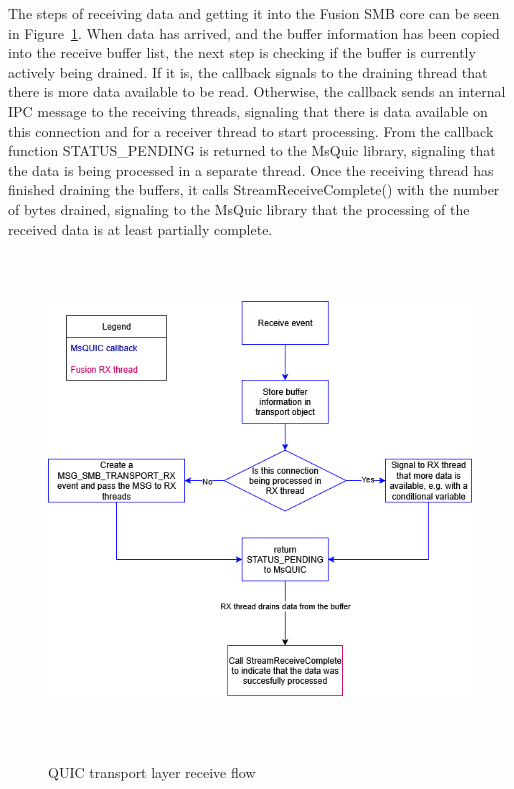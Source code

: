 \documentclass[english, 12pt, a4paper, elec, utf8, a-2b, online]{aaltothesis}
\begin{document}
The steps of receiving data and getting it into the Fusion SMB core can be seen in Figure~\ref{fig:msquic_rx}.
When data has arrived, and the buffer information has been copied into the receive buffer list, the
next step is checking if the buffer is currently actively being drained. If it is,
the callback signals to the draining thread that there is more data available to be read. Otherwise,
the callback sends an internal IPC message to the receiving threads, signaling that there is data available
on this connection and for a receiver thread to start processing. From the callback function
STATUS\_PENDING is returned to the MsQuic library, signaling that the data is being
processed in a separate thread. Once the receiving thread has finished draining the buffers,
it calls StreamReceiveComplete() with the number of bytes drained, signaling to the
MsQuic library that the processing of the received data is at least partially complete. 
\begin{figure}[h]
	\centering
	\includegraphics[alt={Block diagram of the flow when receiving data using the MsQuic library}, height=13cm]{./images/receive_flow.png}
	\caption{QUIC transport layer receive flow}
	\label{fig:msquic_rx}
\end{figure}
\end{document}
